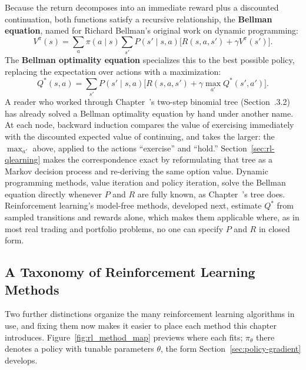 \documentclass[../ai_in_finance]{subfiles}
\begin{document}
Because the return decomposes into an immediate reward plus a discounted continuation, both functions satisfy a recursive relationship, the \textbf{Bellman equation}, named for Richard Bellman's original work on dynamic programming:
\begin{equation}
V^\pi(s) = \sum_a \pi(a \mid s) \sum_{s'} P(s' \mid s, a)\Big[R(s,a,s') + \gamma V^\pi(s')\Big].
\label{eq:rl-bellman}
\end{equation}
The \textbf{Bellman optimality equation} specializes this to the best possible policy, replacing the expectation over actions with a maximization:
\begin{equation}
Q^*(s,a) = \sum_{s'} P(s' \mid s, a)\Big[R(s,a,s') + \gamma \max_{a'} Q^*(s',a')\Big].
\label{eq:rl-bellman-optimality}
\end{equation}
A reader who worked through Chapter~'s two-step binomial tree (Section~.3.2) has already solved a Bellman optimality equation by hand under another name. At each node, backward induction compares the value of exercising immediately with the discounted expected value of continuing, and takes the larger: the $\max_{a'}$ above, applied to the actions ``exercise'' and ``hold.'' Section~\ref{sec:rl-qlearning} makes the correspondence exact by reformulating that tree as a Markov decision process and re-deriving the same option value. Dynamic programming methods, value iteration and policy iteration, solve the Bellman equation directly whenever $P$ and $R$ are fully known, as Chapter~'s tree does. Reinforcement learning's model-free methods, developed next, estimate $Q^*$ from sampled transitions and rewards alone, which makes them applicable where, as in most real trading and portfolio problems, no one can specify $P$ and $R$ in closed form.

\subsection{A Taxonomy of Reinforcement Learning Methods}
\label{sec:rl-taxonomy}

Two further distinctions organize the many reinforcement learning algorithms in use, and fixing them now makes it easier to place each method this chapter introduces. Figure~\ref{fig:rl_method_map} previews where each fits; $\pi_\theta$ there denotes a policy with tunable parameters $\theta$, the form Section~\ref{sec:policy-gradient} develops.
\end{document}
